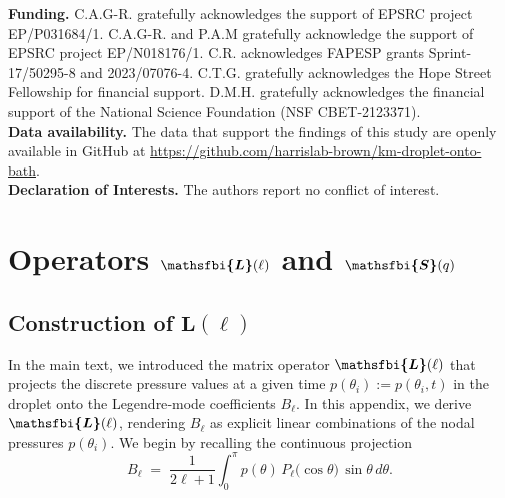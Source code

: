 \documentclass{jfm}
\newcommand{\bfjfm}[1]{\bm{\mathsfbi{#1}}}
\begin{document}
{\small
 \noindent\textbf{Funding.} C.A.G-R. gratefully acknowledges the support of EPSRC project EP/P031684/1. C.A.G-R. and P.A.M gratefully acknowledge the support of EPSRC project EP/N018176/1. C.R. acknowledges FAPESP grants Sprint-17/50295-8 and 2023/07076-4. C.T.G. gratefully acknowledges the Hope Street Fellowship for financial support. D.M.H. gratefully acknowledges the financial support of the National Science Foundation (NSF CBET-2123371).\\

 \noindent\textbf{Data availability.} The data that support the findings of this study are openly available in GitHub at \href{https://github.com/harrislab-brown/km-droplet-onto-bath}{https://github.com/harrislab-brown/km-droplet-onto-bath}. \\

 \noindent\textbf{Declaration of Interests.}
The authors report no conflict of interest. \\ }

\appendix



\section{Operators \(\bfjfm{L}(\ell)\) and $\bfjfm{S}(q)$}
\label{section:Appendix_L}
\subsection{Construction of $\mathbf{L}(\ell)$}
In the main text, we introduced the matrix operator \(\bfjfm{L}(\ell)\) that projects the discrete pressure values at a given time
\(p(\theta_i) :=p(\theta_i, t)\) in the droplet onto the Legendre‐mode coefficients \(B_\ell\).  In this appendix, we derive \(\bfjfm{L}(\ell)\), rendering $B_\ell$ as explicit linear combinations of the nodal pressures \(p(\theta_i)\).  We begin by recalling the continuous projection
\begin{equation}
B_\ell \;=\;\frac{1}{2\ell+1}\int_{0}^{\pi} p(\theta)\,P_\ell\bigl(\cos\theta\bigr)\,\sin\theta\,d\theta.
\end{equation}
\end{document}
